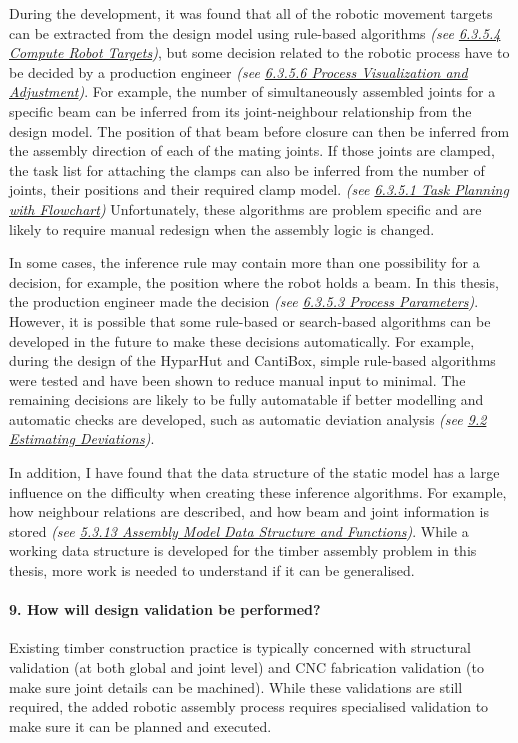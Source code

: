 During the development, it was found that all of the robotic movement targets can be extracted from the design model using rule-based algorithms \textit{(see \ul{6.3.5.4 Compute Robot Targets})}, but some decision related to the robotic process have to be decided by a production engineer \textit{(see \ul{6.3.5.6 Process Visualization and Adjustment})}. For example, the number of simultaneously assembled joints for a specific beam can be inferred from its joint-neighbour relationship from the design model. The position of that beam before closure can then be inferred from the assembly direction of each of the mating joints. If those joints are clamped, the task list for attaching the clamps can also be inferred from the number of joints, their positions and their required clamp model. \textit{(see \ul{6.3.5.1 Task Planning with Flowchart}) }Unfortunately, these algorithms are problem specific and are likely to require manual redesign when the assembly logic is changed. 

In some cases, the inference rule may contain more than one possibility for a decision, for example, the position where the robot holds a beam. In this thesis, the production engineer made the decision \textit{(see \ul{6.3.5.3 Process Parameters})}. However, it is possible that some rule-based or search-based algorithms can be developed in the future to make these decisions automatically. For example, during the design of the HyparHut and CantiBox, simple rule-based algorithms were tested and have been shown to reduce manual input to minimal. The remaining decisions are likely to be fully automatable if better modelling and automatic checks are developed, such as automatic deviation analysis\textit{ (see \ul{9.2 Estimating Deviations})}.

In addition, I have found that the data structure of the static model has a large influence on the difficulty when creating these inference algorithms. For example, how neighbour relations are described, and how beam and joint information is stored \textit{(see \ul{5.3.13 Assembly Model Data Structure and Functions})}. While a working data structure is developed for the timber assembly problem in this thesis, more work is needed to understand if it can be generalised. 

\paragraph{9. How will design validation be performed?}

Existing timber construction practice is typically concerned with structural validation (at both global and joint level) and CNC fabrication validation (to make sure joint details can be machined). While these validations are still required, the added robotic assembly process requires specialised validation to make sure it can be planned and executed. 


